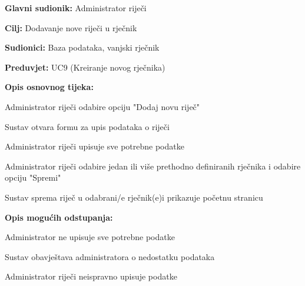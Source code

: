 						\noindent {}
					\begin{packed_item}
						
						\item \textbf{Glavni sudionik: }Administrator riječi
						\item  \textbf{Cilj:} Dodavanje nove riječi u rječnik
						\item  \textbf{Sudionici:} Baza podataka, vanjski rječnik
						\item  \textbf{Preduvjet:} UC9 (Kreiranje novog rječnika)
						\item  \textbf{Opis osnovnog tijeka:}
						
						\item[] \begin{packed_enum}
							
							\item Administrator riječi odabire opciju "Dodaj novu riječ"
							\item Sustav otvara formu za upis podataka o riječi
							\item Administrator riječi upisuje sve potrebne podatke
							\item Administrator riječi odabire jedan ili više prethodno definiranih rječnika i odabire opciju "Spremi"
							\item Sustav sprema riječ u odabrani/e rječnik(e)i prikazuje početnu stranicu
						\end{packed_enum}
						
						\item  \textbf{Opis mogućih odstupanja:}
						
						\item[] \begin{packed_item}
							
							\item[3.a] Administrator ne upisuje sve potrebne podatke
							\item[] \begin{packed_enum}
								
								\item Sustav obavještava administratora o nedostatku podataka
								
							\end{packed_enum}	
							
							\item[3.b] Administrator riječi neispravno upisuje podatke
							\item[] \begin{packed_enum}
								

\end{packed_enum}
\end{packed_item}
\end{packed_item}
